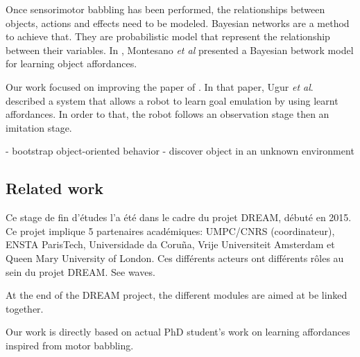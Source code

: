 \documentclass{llncs}
\begin{document}

Once sensorimotor babbling has been performed, the relationships between objects, actions and effects need to be modeled. Bayesian networks are a method to achieve that. They are probabilistic model that represent the relationship between their variables. In \cite{4456755}, Montesano \textit{et al} presented a Bayesian betwork model for learning object affordances.

Our work focused on improving the paper of \cite{Ugur2011}. In that paper, Ugur \textit{et al}.
described a system that allows a robot to learn goal emulation by using learnt affordances. In order to that, the robot follows an observation stage then an imitation stage.

- bootstrap object-oriented behavior
- discover object in an unknown environment

\subsection{Related work}

Ce stage de fin d'études l'a été dans le cadre du projet DREAM, débuté en 2015. Ce projet implique 5 partenaires académiques: UMPC/CNRS (coordinateur), ENSTA ParisTech, Universidade da Coruña, Vrije Universiteit Amsterdam et Queen Mary University of London. Ces différents acteurs ont différents rôles au sein du projet DREAM. See waves.

At the end of the DREAM project, the different modules are aimed at be linked together.

Our work is directly based on actual PhD student's work on learning affordances inspired from motor babbling.

\end{document}
